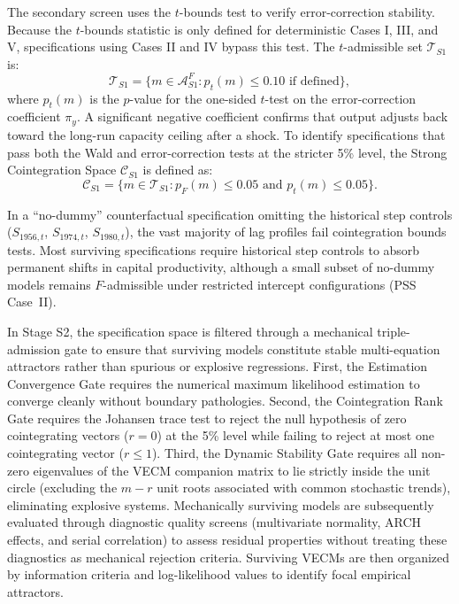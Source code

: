 The secondary screen uses the $t$-bounds test to verify error-correction stability. Because the $t$-bounds statistic is only defined for deterministic Cases I, III, and V, specifications using Cases II and IV bypass this test. The $t$-admissible set $\mathcal{T}_{S1}$ is:
\begin{equation}
\mathcal{T}_{S1} = \{ m \in \mathcal{A}^{F}_{S1} : p_t(m) \leq 0.10 \text{ if defined} \},
\label{eq:T_S1}
\end{equation}
where $p_t(m)$ is the $p$-value for the one-sided $t$-test on the error-correction coefficient $\pi_y$. A significant negative coefficient confirms that output adjusts back toward the long-run capacity ceiling after a shock. To identify specifications that pass both the Wald and error-correction tests at the stricter 5\% level, the Strong Cointegration Space $\mathcal{C}_{S1}$ is defined as:
\begin{equation}
\mathcal{C}_{S1} = \{ m \in \mathcal{T}_{S1} : p_F(m) \leq 0.05 \text{ and } p_t(m) \leq 0.05 \}.
\label{eq:C_S1}
\end{equation}

In a ``no-dummy'' counterfactual specification omitting the historical step controls ($S_{1956,t}$, $S_{1974,t}$, $S_{1980,t}$), the vast majority of lag profiles fail cointegration bounds tests. Most surviving specifications require historical step controls to absorb permanent shifts in capital productivity, although a small subset of no-dummy models remains $F$-admissible under restricted intercept configurations (PSS Case~II).

In Stage S2, the specification space is filtered through a mechanical triple-admission gate to ensure that surviving models constitute stable multi-equation attractors rather than spurious or explosive regressions. First, the Estimation Convergence Gate requires the numerical maximum likelihood estimation to converge cleanly without boundary pathologies. Second, the Cointegration Rank Gate requires the Johansen trace test to reject the null hypothesis of zero cointegrating vectors ($r=0$) at the 5\% level while failing to reject at most one cointegrating vector ($r \leq 1$). Third, the Dynamic Stability Gate requires all non-zero eigenvalues of the VECM companion matrix to lie strictly inside the unit circle (excluding the $m - r$ unit roots associated with common stochastic trends), eliminating explosive systems. Mechanically surviving models are subsequently evaluated through diagnostic quality screens (multivariate normality, ARCH effects, and serial correlation) to assess residual properties without treating these diagnostics as mechanical rejection criteria. Surviving VECMs are then organized by information criteria and log-likelihood values to identify focal empirical attractors.

